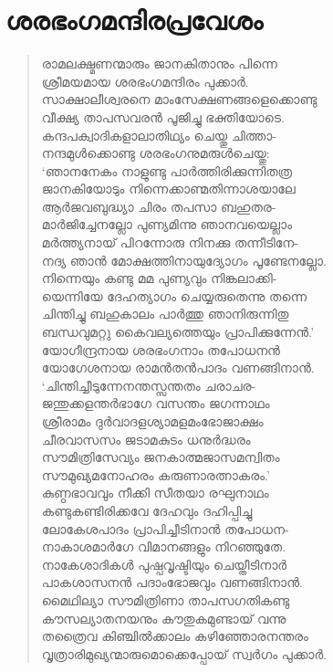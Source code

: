 \section{ശരഭംഗമന്ദിരപ്രവേശം}

\begin{verse}
രാമലക്ഷ്മണന്മാരും ജാനകിതാനും പിന്നെ\\
ശ്രീമയമായ ശരഭംഗമന്ദിരം പുക്കാര്‍.\\
സാക്ഷാലീശ്വരനെ മാംസേക്ഷണങ്ങളെക്കൊണ്ടു\\
വീക്ഷ്യ താപസവരന്‍ പൂജിച്ചു ഭക്തിയോടെ.\\
കന്ദപക്വാദികളാലാതിഥ്യം ചെയ്തു ചിത്താ-\\
നന്ദമുള്‍ക്കൊണ്ടു ശരഭംഗനുമരുള്‍ചെയ്തു:\\
‘ഞാനനേകം നാളുണ്ടു പാര്‍ത്തിരിക്കുന്നിതത്ര\\
ജാനകിയോടും നിന്നെക്കാണ്മതിന്നാശയാലേ\\
ആര്‍ജവബുദ്ധ്യാ ചിരം തപസാ ബഹുതര-\\
മാര്‍ജിച്ചേനല്ലോ പുണ്യമിന്നു ഞാനവയെല്ലാം\\
മര്‍ത്ത്യനായ് പിറന്നോരു നിനക്കു തന്നീടിനേ-\\
നദ്യ ഞാന്‍ മോക്ഷത്തിനായുദ്യോഗം പൂണ്ടേനല്ലോ.\\
നിന്നെയും കണ്ടു മമ പുണ്യവും നിങ്കലാക്കി-\\
യെന്നിയേ ദേഹത്യാഗം ചെയ്യരുതെന്നു തന്നെ\\
ചിന്തിച്ചു ബഹുകാലം പാര്‍ത്തു ഞാനിരുന്നിതു\\
ബന്ധവുമറ്റു കൈവല്യത്തെയും പ്രാപിക്കുന്നേന്‍.’\\
യോഗീന്ദ്രനായ ശരഭംഗനാം തപോധനന്‍\\
യോഗേശനായ രാമന്‍തന്‍പാദം വണങ്ങിനാന്‍.\\
‘ചിന്തിച്ചീടുന്നേനന്തസ്സന്തതം ചരാചര-\\
ജന്തുക്കളന്തര്‍ഭാഗേ വസന്തം ജഗന്നാഥം\\
ശ്രീരാമം ദുര്‍വാദളശ്യാമളമംഭോജാക്ഷം\\
ചീരവാസസം ജടാമകുടം ധനുര്‍ദ്ധരം\\
സൗമിത്രിസേവ്യം ജനകാത്മജാസമന്വിതം\\
സൗമുഖ്യമനോഹരം കരുണാരത്നാകരം.’\\
കുണ്ഠഭാവവും നീക്കി സീതയാ രഘുനാഥം\\
കണ്ടുകണ്ടിരിക്കവേ ദേഹവും ദഹിപ്പിച്ചു\\
ലോകേശപാദം പ്രാപിച്ചീടിനാന്‍ തപോധന-\\
നാകാശമാര്‍ഗേ വിമാനങ്ങളും നിറഞ്ഞുതേ.\\
നാകേശാദികള്‍ പുഷ്പവൃഷ്ടിയും ചെയ്തീടിനാര്‍\\
പാകശാസനന്‍ പദാംഭോജവും വണങ്ങിനാന്‍.\\
മൈഥില്യാ സൗമിത്രിണാ താപസഗതികണ്ടു\\
കൗസല്യാതനയനും കൗതുകമുണ്ടായ് വന്നു\\
തത്രൈവ കിഞ്ചില്‍ക്കാലം കഴിഞ്ഞോരനന്തരം\\
വൃത്രാരിമുഖ്യന്മാരുമൊക്കെപ്പോയ് സ്വര്‍ഗം പുക്കാര്‍.
\end{verse}
\bigskip


